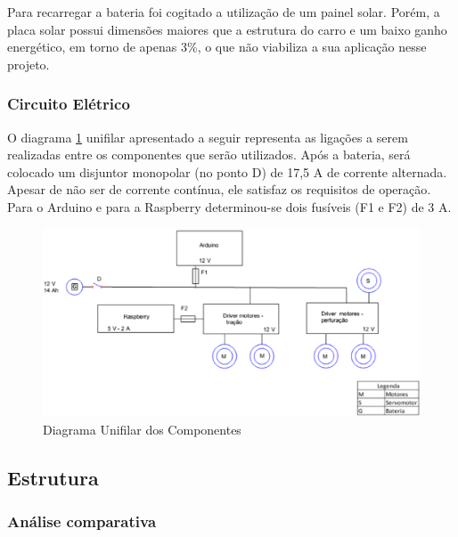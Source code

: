       Para recarregar a bateria foi cogitado a utilização de um painel solar. Porém, a placa solar possui dimensões maiores 
      que a estrutura do carro e um baixo ganho energético, em torno de apenas 3\%, o que não viabiliza a sua aplicação nesse 
      projeto.
      
      \subsubsection{Circuito Elétrico}
      
      O diagrama \ref{diagramaunifilar} unifilar apresentado a seguir representa as ligações a serem realizadas entre os componentes que serão utilizados. 
      Após a bateria, será colocado um disjuntor monopolar (no ponto D) de 17,5 A de corrente alternada. Apesar de não ser de 
      corrente contínua, ele satisfaz os requisitos de operação. Para o Arduino e para a Raspberry determinou-se dois fusíveis 
      (F1 e F2) de 3 A.
      
      \begin{figure}[!htbp]
	\centering
	\label{diagramaunifilar}
	  \includegraphics[keepaspectratio=true,scale=0.6]{figuras/diagramaunifilar.eps}
	\caption{Diagrama Unifilar dos Componentes}
      \end{figure}
      
  \newpage
  \subsection{Estrutura}
  
  \subsubsection{Análise comparativa}
  

